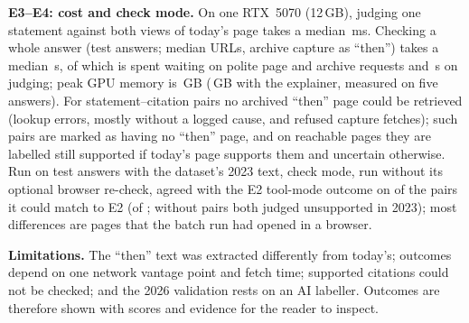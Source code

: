 \textbf{E3--E4: cost and check mode.} On one RTX~5070 (12\,GB), judging one statement against both views of today's page takes a median \judgeBothMs\,ms. Checking a whole answer (\eThreeN test answers; median \eThreeUrls URLs, archive capture as ``then'') takes a median \eThreeMedianS\,s, of which \eThreeNetShare is spent waiting on polite page and archive requests and \eThreeJudgeS\,s on judging; peak GPU memory is \eThreeGpuGB\,GB (\eThreeExplainGpuGB\,GB with the explainer, measured on five answers). For \eThreeArchFail statement--citation pairs no archived ``then'' page could be retrieved (\eThreeArchLookup lookup errors, mostly without a logged cause, and \eThreeArchFetch refused capture fetches); such pairs are marked as having no ``then'' page, and on reachable pages they are labelled still supported if today's page supports them and uncertain otherwise. Run on \eFourN test answers with the dataset's 2023 text, check mode, run without its optional browser re-check, agreed with the E2 tool-mode outcome on \eFourAgree of the \eFourPairs pairs it could match to E2 (of \eFourTotal; \eFourAgreeExNever without pairs both judged unsupported in 2023); most differences are pages that the batch run had opened in a browser.

\textbf{Limitations.} The ``then'' text was extracted differently from today's; outcomes depend on one network vantage point and fetch time; \nUnverPairs supported citations could not be checked; and the 2026 validation rests on an AI labeller. Outcomes are therefore shown with scores and evidence for the reader to inspect.

